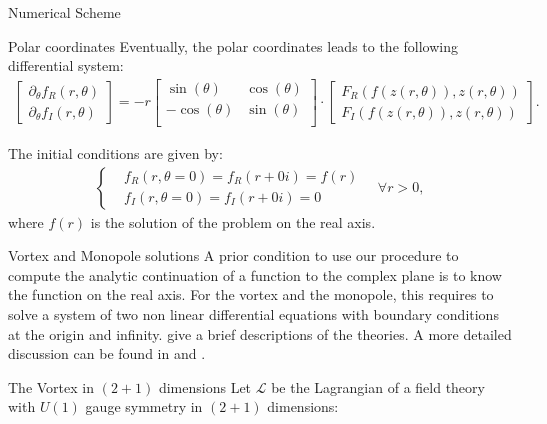 \begin{section}{Numerical Scheme}
\begin{subsection}{Polar coordinates}
      Eventually, the polar coordinates leads to the following
      differential system:
      \begin{align}
        \begin{bmatrix}
          \partial_\theta f_{R}(r,\theta)\\
          \partial_\theta f_{I}(r,\theta)
        \end{bmatrix}
        =-r
        \begin{bmatrix}
          \sin(\theta) & \cos(\theta)\\
          -\cos(\theta) &  \sin(\theta)\\
        \end{bmatrix}\cdot
        \begin{bmatrix}
          F_{R}(f(z(r,\theta)), z(r,\theta))\\
          F_{I}(f(z(r,\theta)), z(r,\theta))
        \end{bmatrix}.
      \end{align}
    \end{subsection}
    The initial conditions are given by:
    \begin{align}
      \left\{
      \begin{aligned}
        &f_R(r,\theta=0) = f_R(r+0i) = f(r)\\
        &f_I(r,\theta=0) = f_I(r+0i) = 0
      \end{aligned}
      \right.\quad \forall r>0,
    \end{align}
    where $f(r)$ is the solution of the problem on the real axis.
  \begin{subsection}{Vortex and Monopole solutions}
    A prior condition to use our procedure to compute the analytic
    continuation of a function to the complex plane is to know the
    function on the real axis. For the vortex and the monopole, this
    requires to solve a system of two non linear differential
    equations with boundary conditions at the origin and infinity.
    give a brief descriptions of the theories. A more detailed
    discussion can be found in \cite{rub} and \cite{shn}.
    \begin{subsubsection}{The Vortex in $(2+1)$ dimensions}\label{sec:theory_vortex}
      Let $\mathcal L$ be the Lagrangian of a field theory with $U(1)$
      gauge symmetry in $(2+1)$ dimensions:
      \begin{align}

\end{align}
\end{subsubsection}
\end{subsection}
\end{section}
